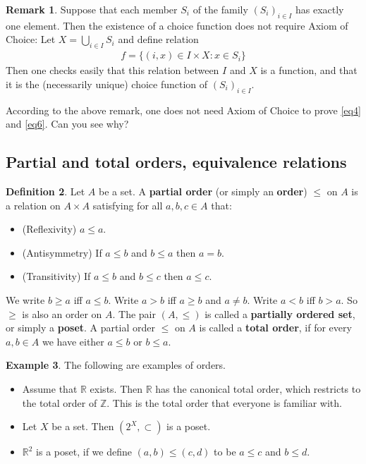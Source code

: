 \documentclass[12pt,b5paper,notitlepage]{article}
\theoremstyle{definition}
\newtheorem{df}{Definition}[section]
\newtheorem{eg}[df]{Example}
\newtheorem{rem}[df]{Remark}
\theoremstyle{plain}
\newcommand{\Zbb}{\mathbb Z}
\newcommand{\Rbb}{\mathbb R}
\numberwithin{equation}{section}
\begin{document}
\begin{rem}
Suppose that each member $S_i$ of the family $(S_i)_{i\in I}$ has exactly one element. Then the existence of a choice function does not require Axiom of Choice: Let $X=\bigcup_{i\in I}S_i$ and define relation
\begin{align*}
f=\{(i,x)\in I\times X: x\in S_i\}
\end{align*}
Then one checks easily that this relation between $I$ and $X$ is a function, and that it is the (necessarily unique) choice function of $(S_i)_{i\in I}$.
\end{rem}

According to the above remark, one does not need Axiom of Choice to prove \eqref{eq4} and \eqref{eq6}. Can you see why?


\subsection{Partial and total orders, equivalence relations}\label{lb299}

\begin{df}
Let $A$ be a set. A \textbf{partial order} (or simply an \textbf{order}) $\leq$ on $A$ is a relation on $A\times A$ satisfying for all $a,b,c\in A$ that:
\begin{itemize}
\item (Reflexivity) $a\leq a$.
\item (Antisymmetry) If $a\leq b$ and $b\leq a$ then $a=b$.
\item (Transitivity) If $a\leq b$ and $b\leq c$ then $a\leq c$.
\end{itemize}
We write $b\geq a$ iff $a\leq b$. Write $a>b$ iff $a\geq b$ and $a\neq b$. Write $a<b$ iff $b>a$. So $\geq$ is also an order on $A$. The pair $(A,\leq)$ is called a \textbf{partially ordered set}, or simply a \textbf{poset}.  A partial order $\leq$ on $A$ is called a \textbf{total order}, if for every $a,b\in A$ we have either $a\leq b$ or $b\leq a$.
\end{df}


\begin{eg}
The following are examples of orders.
\begin{itemize}
\item Assume that $\Rbb$ exists. Then $\Rbb$ has the canonical total order, which restricts to the total order of $\Zbb$. This is the total order that everyone is familiar with.
\item Let $X$ be a set. Then $(2^X,\subset)$ is a poset.
\item $\Rbb^2$ is a poset, if we define $(a,b)\leq (c,d)$ to be $a\leq c$ and $b\leq d$. 
\end{itemize}
\end{eg}
\end{document}
